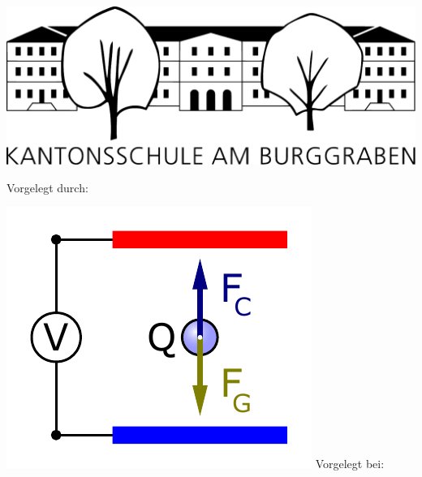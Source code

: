 
\begin{titlepage}
	\centering
	\includegraphics[width=.3\textwidth]{title_logo.pdf}\\[.25cm]
	{\scshape\paperinstitution\par}
	\vspace{1cm}
	{\scshape\Large\papertype\par}
	\vspace{1.5cm}
	{\huge\bfseries\papertitle\par}
	\vspace{2cm}
	{\Large Vorgelegt durch:\par\paperauthor\par}
	\vfill
	\includegraphics{titelbildMaturaarbeit.pdf}
	\vfill
	Vorgelegt bei:\par
	{\sc\papersupervisor\par}
	\vspace{1cm}
	{\large\paperdate\par}
\end{titlepage}